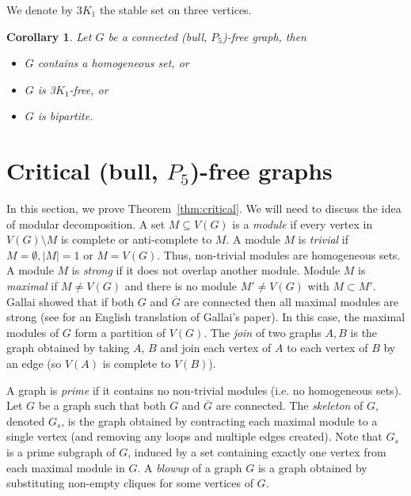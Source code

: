 \documentclass[a4paper,11pt]{article}
\newtheorem{corollary}[theorem]{Corollary}
\theoremstyle{case}
\begin{document}
We denote by $3K_1$ the stable set on three vertices.
\begin{corollary}\label{cor:bull-P5-free}
    Let $G$ be a connected (bull, $P_5$)-free graph, then
    \begin{itemize}[noitemsep, topsep=0pt]
        \item[$(i)$] $G$ contains a homogeneous set, or
        \item[$(ii)$] $G$ is 3$K_1$-free, or
        \item[$(iii)$] $G$ is bipartite.
    \end{itemize}
\end{corollary}

\section{Critical (bull, $P_5$)-free graphs}\label{sec:critical}
In this section, we prove Theorem~\ref{thm:critical}. We will need to discuss the idea of modular decomposition. 
A set $M \subseteq V(G)$ is a {\it module} if every vertex in $V(G) \setminus M$ is complete or anti-complete to $M$. A module $M$ is {\it trivial} if $M = \emptyset, |M| =1$ or $M = V(G)$. Thus, non-trivial modules are homogeneous sets.  A module $M$ is {\it strong} if it does not overlap another module. Module $M$ is {\it maximal}  if $M \not= V(G)$ and there is no module $M' \not= V(G)$ with $M \subset M'$. Gallai \cite{Gal1967} showed that if both $G$ and $\overline{G}$ are connected then all maximal modules are strong (see \cite{MafPre2001} for an English translation of Gallai's paper). In this case, the maximal modules of $G$ form a partition of $V(G)$. The {\it join} of two graphs $A,B$ is the graph obtained by taking $A$, $B$ and join each vertex of $A$ to each vertex of $B$ by an edge (so $V(A)$ is complete to $V(B)$). 

A graph is {\it prime} if it contains no non-trivial modules (i.e. no homogeneous sets). Let $G$ be a graph such that both $G$ and $\overline{G}$ are connected. The \emph{skeleton} of $G$, denoted $G_{s}$, is the graph obtained by contracting each maximal module to a single vertex (and removing any loops and multiple edges created). Note that $G_{s}$ is a prime subgraph of $G$, induced by a set containing exactly one vertex from each maximal module in $G$.
A \emph{blowup} of a graph $G$ is a graph obtained by substituting non-empty cliques for some vertices of $G$.
\end{document}
